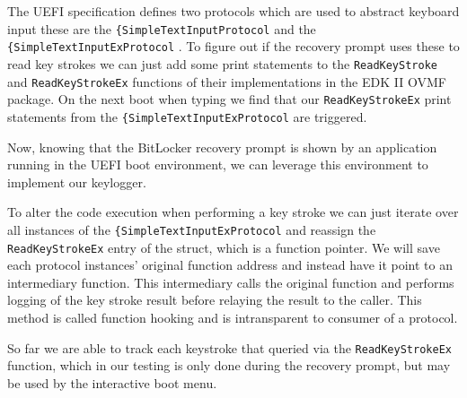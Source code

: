 The \ac{UEFI} specification defines two protocols which are used to abstract keyboard input these are the \lstinline{{SimpleTextInputProtocol} and the \lstinline{{SimpleTextInputExProtocol} \cite[12.2, 12.3]{uefi-spec}. To figure out if the recovery prompt uses these to read key strokes we can just add some print statements to the \lstinline{ReadKeyStroke} and \lstinline{ReadKeyStrokeEx} functions of their implementations in the \ac{EDK} II \ac{OVMF} package. On the next boot when typing we find that our \lstinline{ReadKeyStrokeEx} print statements from the \lstinline{{SimpleTextInputExProtocol} are triggered.

Now, knowing that the BitLocker recovery prompt is shown by an application running in the \ac{UEFI} boot environment, we can leverage this environment to implement our keylogger.

To alter the code execution when performing a key stroke we can just iterate over all instances of the \lstinline{{SimpleTextInputExProtocol} and reassign the \lstinline{ReadKeyStrokeEx} entry of the struct, which is a function pointer. We will save each protocol instances' original function address and instead have it point to an intermediary function. This intermediary calls the original function and performs logging of the key stroke result before relaying the result to the caller. This method is called function hooking and is intransparent to consumer of a protocol.



So far we are able to track each keystroke that queried via the \lstinline{ReadKeyStrokeEx} function, which in our testing is only done during the recovery prompt, but may be used by the interactive boot menu.

